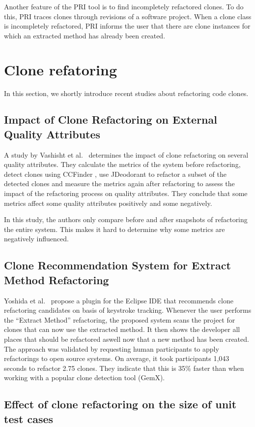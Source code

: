 Another feature of the PRI tool is to find incompletely refactored clones. To do this, PRI traces clones through revisions of a software project. When a clone class is incompletely refactored, PRI informs the user that there are clone instances for which an extracted method has already been created.

\section{Clone refatoring}
In this section, we shortly introduce recent studies about refactoring code clones.

\subsection{Impact of Clone Refactoring on External Quality Attributes}
A study by Vashisht et al.~\cite{vashisht2018impact} determines the impact of clone refactoring on several quality attributes. They calculate the metrics of the system before refactoring, detect clones using CCFinder \cite{kamiya2002ccfinder}, use JDeodorant to refactor a subset of the detected clones \cite{mazinanian2016jdeodorant} and measure the metrics again after refactoring to assess the impact of the refactoring process on quality attributes. They conclude that some metrics affect some quality attributes positively and some negatively.

In this study, the authors only compare before and after snapshots of refactoring the entire system. This makes it hard to determine why some metrics are negatively influenced.

\subsection{Clone Recommendation System for Extract Method Refactoring}
Yoshida et al.~\cite{yoshida2019proactive} propose a plugin for the Eclipse IDE that recommends clone refactoring candidates on basis of keystroke tracking. Whenever the user performs the ``Extract Method'' refactoring, the proposed system scans the project for clones that can now use the extracted method. It then shows the developer all places that should be refactored aswell now that a new method has been created. The approach was validated by requesting human participants to apply refactorings to open source systems. On average, it took participants 1,043 seconds to refactor 2.75 clones. They indicate that this is 35\% faster than when working with a popular clone detection tool (GemX).

\subsection{Effect of clone refactoring on the size of unit test cases}
\cite{badri2019measuring}
